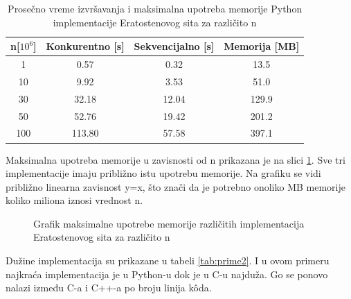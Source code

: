 \documentclass[12pt,oneside]{memoir}
\begin{document}
\begin{table}
\begin{center}
\caption{Prosečno vreme izvršavanja i maksimalna upotreba memorije Python implementacije Eratostenovog sita za različito n}
\begin{tabular}{||c||c|c|c||}
\hline
n[$10^{6}$] & Konkurentno [s]& Sekvencijalno [s] & Memorija [MB] \\ \hline
1	&0.57	&0.32&13.5\\
10	&9.92&3.53&51.0\\
30	&32.18&12.04&129.9\\
50	&52.76&19.42&201.2\\
100	&113.80&57.58&397.1\\
\hline
\end{tabular}
\label{tab:prime1}
\end{center}
\end{table}

Maksimalna upotreba memorije u zavisnosti od n prikazana je na slici \ref{fig:prime2}. Sve tri implementacije imaju približno istu upotrebu memorije. Na grafiku se vidi približno linearna zavisnost y=x, što znači da je potrebno onoliko MB memorije koliko miliona iznosi vrednost n.

\begin{figure}
\begin{center}


\caption{Grafik maksimalne upotrebe memorije različitih implementacija Eratostenovog sita za različito n}
\label{fig:prime2}
\end{center}
\end{figure}


Dužine implementacija su prikazane u tabeli \ref{tab:prime2}. I u ovom primeru najkraća implementacija je u Python-u dok je u C-u najduža. Go se ponovo nalazi između C-a i C++-a po broju linija k\^{o}da.
\end{document}
